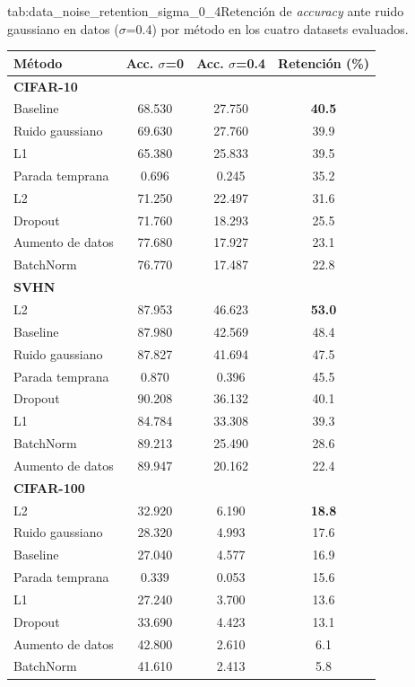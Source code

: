 \begin{table}{tab:data_noise_retention_sigma_0_4}{Retención de \textit{accuracy} ante ruido gaussiano en datos ($\sigma$=0.4) por método en los cuatro datasets evaluados.}
\small
\begin{tabular}{lccc}
\toprule
\textbf{Método} & \textbf{Acc. $\sigma$=0} & \textbf{Acc. $\sigma$=0.4} & \textbf{Retención (\%)} \\
\midrule
\multicolumn{4}{l}{\textbf{CIFAR-10}}\\
\midrule
Baseline & 68.530 & 27.750 & \textbf{40.5} \\
Ruido gaussiano & 69.630 & 27.760 & 39.9 \\
L1 & 65.380 & 25.833 & 39.5 \\
Parada temprana & 0.696 & 0.245 & 35.2 \\
L2 & 71.250 & 22.497 & 31.6 \\
Dropout & 71.760 & 18.293 & 25.5 \\
Aumento de datos & 77.680 & 17.927 & 23.1 \\
BatchNorm & 76.770 & 17.487 & 22.8 \\
\midrule
\multicolumn{4}{l}{\textbf{SVHN}}\\
\midrule
L2 & 87.953 & 46.623 & \textbf{53.0} \\
Baseline & 87.980 & 42.569 & 48.4 \\
Ruido gaussiano & 87.827 & 41.694 & 47.5 \\
Parada temprana & 0.870 & 0.396 & 45.5 \\
Dropout & 90.208 & 36.132 & 40.1 \\
L1 & 84.784 & 33.308 & 39.3 \\
BatchNorm & 89.213 & 25.490 & 28.6 \\
Aumento de datos & 89.947 & 20.162 & 22.4 \\
\midrule
\multicolumn{4}{l}{\textbf{CIFAR-100}}\\
\midrule
L2 & 32.920 & 6.190 & \textbf{18.8} \\
Ruido gaussiano & 28.320 & 4.993 & 17.6 \\
Baseline & 27.040 & 4.577 & 16.9 \\
Parada temprana & 0.339 & 0.053 & 15.6 \\
L1 & 27.240 & 3.700 & 13.6 \\
Dropout & 33.690 & 4.423 & 13.1 \\
Aumento de datos & 42.800 & 2.610 & 6.1 \\
BatchNorm & 41.610 & 2.413 & 5.8 \\

\end{tabular}
\end{table}
